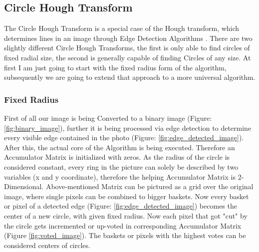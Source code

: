 \subsection{Circle Hough Transform}
The Circle Hough Transform is a special case of the Hough transform, which determines lines in an image through Edge Detection Algorithms \cite{circlehough}. There are two slightly different Circle Hough Transforms, the first is only able to find circles of fixed radial size, the second is generally capable of finding Circles of any size. At first I am just going to start with the fixed radius form of the algorithm, subsequently we are going to extend that approach to a more universal algorithm.

\subsubsection{Fixed Radius}
First of all our image is being Converted to a binary image  (Figure: \ref{fig:binary_image}), further it is being processed via edge detection to determine every visible edge contained in the photo (Figure: \ref{fig:edge_detected_image}).
After this, the actual core of the Algorithm is being executed. Therefore an Accumulator Matrix is initialized with zeros. As the radius of the circle is considered constant, every ring in the picture can solely be described by two variables (x and y coordinate), therefore the helping Accumulator Matrix is 2-Dimensional.
Above-mentioned Matrix can be pictured as a grid over the original image, where single pixels can be combined to bigger baskets. Now every basket or pixel of a detected edge (Figure: \ref{fig:edge_detected_image}) becomes the center of a new circle, with given fixed radius. Now each pixel that got "cut" by the circle gets incremented or up-voted in corresponding Accumulator Matrix (Figure \ref{fig:voted_image}). The baskets or pixels with the highest votes can be considered centers of circles.
\newline

